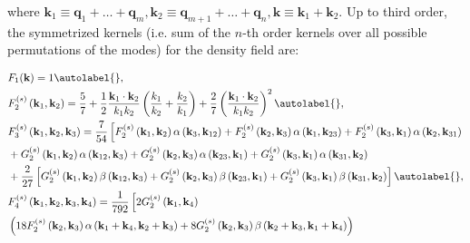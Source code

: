 where $\mathbf{k}_{1} \equiv \mathbf{q}_{1}+\ldots+\mathbf{q}_{m}, \mathbf{k}_{2} \equiv \mathbf{q}_{m+1}+\ldots+\mathbf{q}_{n}, \mathbf{k} \equiv \mathbf{k}_{1}+\mathbf{k}_{2}$. Up to third order, the symmetrized kernels (i.e. sum of the $n$-th order kernels over all possible permutations of the modes) for the density field are:


\begin{align*}
    & F_{1}(\mathbf{k})=1  \autolabel{},\\
    & F_{2}^{(s)}\left(\mathbf{k}_{1}, \mathbf{k}_{2}\right)=\frac{5}{7}+\frac{1}{2} \frac{\mathbf{k}_{1} \cdot \mathbf{k}_{2}}{k_{1} k_{2}}\left(\frac{k_{1}}{k_{2}}+\frac{k_{2}}{k_{1}}\right)+\frac{2}{7}\left(\frac{\mathbf{k}_{1} \cdot \mathbf{k}_{2}}{k_{1} k_{2}}\right)^{2}  \autolabel{},\\
    & F_{3}^{(s)}\left(\mathbf{k}_{1}, \mathbf{k}_{2}, \mathbf{k}_{3}\right)=\frac{7}{54}\left[F_{2}^{(s)}\left(\mathbf{k}_{1}, \mathbf{k}_{2}\right) \alpha\left(\mathbf{k}_{3}, \mathbf{k}_{12}\right)+F_{2}^{(s)}\left(\mathbf{k}_{2}, \mathbf{k}_{3}\right) \alpha\left(\mathbf{k}_{1}, \mathbf{k}_{23}\right)+F_{2}^{(s)}\left(\mathbf{k}_{3}, \mathbf{k}_{1}\right) \alpha\left(\mathbf{k}_{2}, \mathbf{k}_{31}\right)\right. \\
    & +G_{2}^{(s)}\left(\mathbf{k}_{1}, \mathbf{k}_{2}\right) \alpha\left(\mathbf{k}_{12}, \mathbf{k}_{3}\right)+G_{2}^{(s)}\left(\mathbf{k}_{2}, \mathbf{k}_{3}\right) \alpha\left(\mathbf{k}_{23}, \mathbf{k}_{1}\right)+G_{2}^{(s)}\left(\mathbf{k}_{3}, \mathbf{k}_{1}\right) \alpha\left(\mathbf{k}_{31}, \mathbf{k}_{2}\right) \\
    & +\frac{2}{27}\left[G_{2}^{(s)}\left(\mathbf{k}_{1}, \mathbf{k}_{2}\right) \beta\left(\mathbf{k}_{12}, \mathbf{k}_{3}\right)+G_{2}^{(s)}\left(\mathbf{k}_{2}, \mathbf{k}_{3}\right) \beta\left(\mathbf{k}_{23}, \mathbf{k}_{1}\right)+G_{2}^{(s)}\left(\mathbf{k}_{3}, \mathbf{k}_{1}\right) \beta\left(\mathbf{k}_{31}, \mathbf{k}_{2}\right)\right]  \autolabel{},\\
    & F_{4}^{(s)}\left(\mathbf{k}_{1}, \mathbf{k}_{2}, \mathbf{k}_{3}, \mathbf{k}_{4}\right)=\frac{1}{792}\left[2 G_{2}^{(s)}\left(\mathbf{k}_{1}, \mathbf{k}_{4}\right)\right. \\
    & \left(18 F_{2}^{(s)}\left(\mathbf{k}_{2}, \mathbf{k}_{3}\right) \alpha\left(\mathbf{k}_{1}+\mathbf{k}_{4}, \mathbf{k}_{2}+\mathbf{k}_{3}\right)+8 G_{2}^{(s)}\left(\mathbf{k}_{2}, \mathbf{k}_{3}\right) \beta\left(\mathbf{k}_{2}+\mathbf{k}_{3}, \mathbf{k}_{1}+\mathbf{k}_{4}\right)\right) \\

\end{align*}
